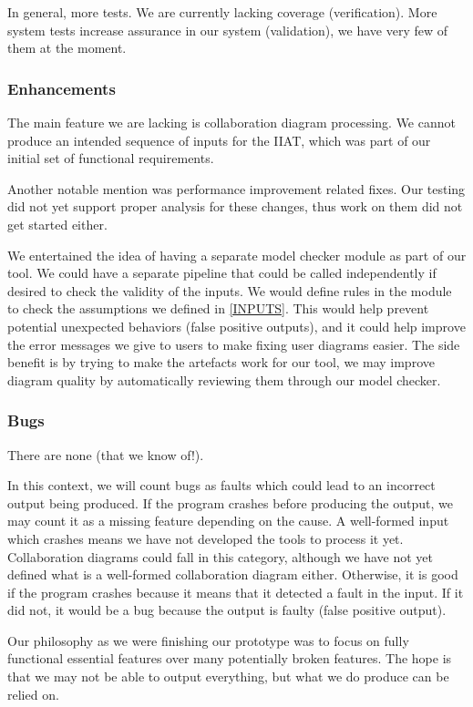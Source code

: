 \documentclass[11pt]{article}
\begin{document}
    In general, more tests.
    We are currently lacking coverage (verification).
    More system tests increase assurance in our system (validation), we have very few of them at the moment.

    \subsubsection{Enhancements}
    The main feature we are lacking is collaboration diagram processing.
    We cannot produce an intended sequence of inputs for the IIAT, which was part of our initial set of functional requirements.

    Another notable mention was performance improvement related fixes.
    Our testing did not yet support proper analysis for these changes, thus work on them did not get started either.

    We entertained the idea of having a separate model checker module as part of our tool.
    We could have a separate pipeline that could be called independently if desired to check the validity of the inputs.
    We would define rules in the module to check the assumptions we defined in \ref{INPUTS}.
    This would help prevent potential unexpected behaviors (false positive outputs),
    and it could help improve the error messages we give to users to make fixing user diagrams easier.
    The side benefit is by trying to make the artefacts work for our tool,
    we may improve diagram quality by automatically reviewing them through our model checker.


    \subsubsection{Bugs}
    There are none (that we know of!).

    In this context, we will count bugs as faults which could lead to an incorrect output being produced.
    If the program crashes before producing the output, we may count it as a missing feature depending on the cause.
    A well-formed input which crashes means we have not developed the tools to process it yet.
    Collaboration diagrams could fall in this category, although we have not yet defined what is a well-formed collaboration diagram either.
    Otherwise, it is good if the program crashes because it means that it detected a fault in the input.
    If it did not, it would be a bug because the output is faulty (false positive output).

    Our philosophy as we were finishing our prototype was to focus on fully functional essential features over many potentially broken features.
    The hope is that we may not be able to output everything, but what we do produce can be relied on.
\end{document}
